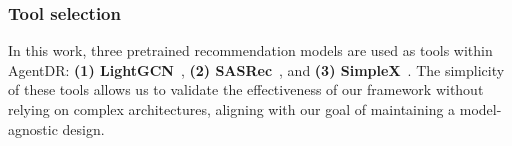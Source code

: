 \subsubsection{Tool selection}\label{sec:toolselect}
In this work, three pretrained recommendation models are used as tools within AgentDR: 
\textbf{(1) LightGCN}~\cite{LightGCN}, \textbf{(2) SASRec}~\cite{sasrec}, and \textbf{(3) SimpleX}~\cite{simplex}.
The simplicity of these tools allows us to validate the effectiveness of our framework without relying on complex architectures, aligning with our goal of maintaining a model-agnostic design.
